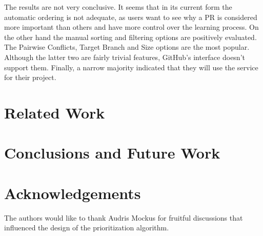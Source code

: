 \documentclass[conference]{IEEEtran}
\begin{document}
The results are not very conclusive.
It seems that in its current form the automatic ordering is not adequate, as users want to see why a 
PR is considered more important than others and have more control over the learning process.
On the other hand the manual sorting and filtering options are positively evaluated.
The Pairwise Conflicts, Target Branch and Size options are the most popular.
Although the latter two are fairly trivial features, GitHub's interface doesn't support them.
Finally, a narrow majority indicated that they will use the service for their project.

\section{Related Work}

\section{Conclusions and Future Work}

\section*{Acknowledgements} The authors would like to thank Audris Mockus for
fruitful discussions that influenced the design of the prioritization algorithm.



\end{document}

